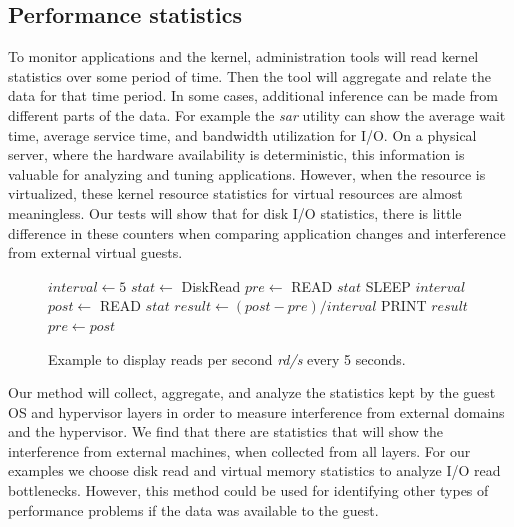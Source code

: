 \subsection{Performance statistics}
To monitor applications and the kernel, administration tools will read kernel statistics over some period of time.  Then the tool will aggregate and relate the data for that time period.  In some cases, additional inference can be made from different parts of the data.  For example the \emph{sar} utility can show the average wait time, average service time, and bandwidth utilization for I/O.  On a physical server, where the hardware availability is deterministic, this information is valuable for analyzing and tuning applications.  However, when the resource is virtualized, these kernel resource statistics for virtual resources are almost meaningless.  Our tests will show that for disk I/O statistics, there is little difference in these counters when comparing application changes and interference from external virtual guests. 

\begin{figure}[h]
\begin{algorithmic}[H]
 \STATE $interval \gets 5$
 \STATE $stat \gets$  DiskRead       
 \STATE $pre \gets $ READ $stat$ 
 \LOOP
    \STATE SLEEP $interval$
    \STATE $post \gets$ READ $stat$
    \STATE $result \gets (post - pre)/interval$
    \STATE PRINT  $result$
    \STATE $pre \gets post$ 
 \ENDLOOP
\end{algorithmic}
\caption{Example to display reads per second \emph{rd/s} every 5 seconds.}
\label{alg1}
\end{figure}

Our method will collect, aggregate, and analyze the statistics kept by the guest OS and hypervisor layers in order to measure interference from external domains and the hypervisor.  We find that there are statistics that will show the interference from external machines, when collected from all layers.  For our examples we choose disk read and virtual memory statistics to analyze I/O read bottlenecks.  However, this method could be used for identifying other types of performance problems if the data was available to the guest.

